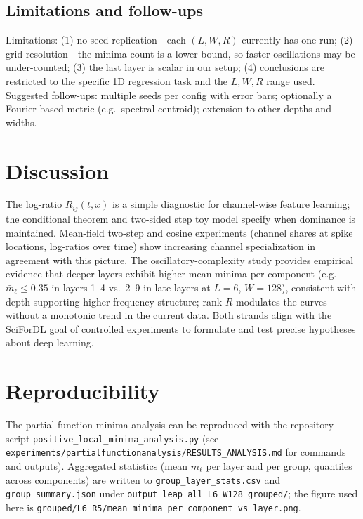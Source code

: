 \documentclass{article}
\theoremstyle{plain}
\theoremstyle{definition}
\begin{document}
\subsection{Limitations and follow-ups}

Limitations: (1) no seed replication---each $(L,W,R)$ currently has one run; (2) grid resolution---the minima count is a lower bound, so faster oscillations may be under-counted; (3) the last layer is scalar in our setup; (4) conclusions are restricted to the specific 1D regression task and the $L,W,R$ range used. Suggested follow-ups: multiple seeds per config with error bars; optionally a Fourier-based metric (e.g.\ spectral centroid); extension to other depths and widths.

\section{Discussion}

The log-ratio $R_{ij}(t,x)$ is a simple diagnostic for channel-wise feature learning; the conditional theorem and two-sided step toy model specify when dominance is maintained. Mean-field two-step and cosine experiments (channel shares at spike locations, log-ratios over time) show increasing channel specialization in agreement with this picture. The oscillatory-complexity study provides empirical evidence that deeper layers exhibit higher mean minima per component (e.g.\ $\bar{m}_\ell \le 0.35$ in layers 1--4 vs.\ 2--9 in late layers at $L=6$, $W=128$), consistent with depth supporting higher-frequency structure; rank $R$ modulates the curves without a monotonic trend in the current data. Both strands align with the SciForDL goal of controlled experiments to formulate and test precise hypotheses about deep learning.




\appendix
\section{Reproducibility}
The partial-function minima analysis can be reproduced with the repository script \texttt{positive\_local\_minima\_analysis.py} (see \texttt{experiments/partialfunctionanalysis/RESULTS\_ANALYSIS.md} for commands and outputs). Aggregated statistics (mean $\bar{m}_\ell$ per layer and per group, quantiles across components) are written to \texttt{group\_layer\_stats.csv} and \texttt{group\_summary.json} under \texttt{output\_leap\_all\_L6\_W128\_grouped/}; the figure used here is \texttt{grouped/L6\_R5/mean\_minima\_per\_component\_vs\_layer.png}.
\end{document}
